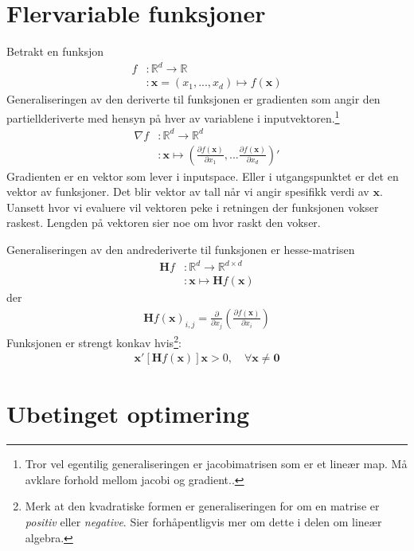 \section{Flervariable funksjoner}
Betrakt en funksjon
\begin{align}
f&: \mathbb{R}^d \to \mathbb{R} \\
&: \mathbf{x}=(x_1,...,x_d) \mapsto f(\mathbf{x})
\end{align}
Generaliseringen av den deriverte til funksjonen er gradienten som angir den partiellderiverte med hensyn på hver av variablene i inputvektoren.\footnote{Tror vel egentilig generaliseringen er jacobimatrisen som er et lineær map. Må avklare forhold mellom jacobi og gradient..}
\begin{align}
\nabla f&:\mathbb{R}^d \to \mathbb{R}^d \\
&:\mathbf{x}\mapsto \left(\frac{\partial f(\mathbf{x})}{\partial x_1},...\frac{\partial f(\mathbf{x})}{\partial x_d}\right)'
\end{align}
Gradienten er en vektor som lever i inputspace. Eller i utgangspunktet er det en vektor av funksjoner. Det blir vektor av tall når vi angir spesifikk verdi av $\mathbf{x}$. Uansett hvor vi evaluere vil vektoren peke i retningen der funksjonen vokser raskest. Lengden på vektoren sier noe om hvor raskt den vokser. 
 
Generaliseringen av den andrederiverte til funksjonen er hesse-matrisen
\begin{align}
\mathbf{H}f &: \mathbb{R}^d \to \mathbb{R}^{d\times d} \\
&:\mathbf{x} \mapsto \mathbf{H}f(\mathbf{x})
\end{align}
der
\begin{align}
\mathbf{H}f(\mathbf{x})_{i,j} = \frac{\partial}{\partial x_j}\left(\frac{\partial f(\mathbf{x})}{\partial x_i}\right)
\end{align}
Funksjonen er strengt konkav hvis\footnote{Merk at den kvadratiske formen er generaliseringen for om en matrise er \textit{positiv} eller \textit{negative}. Sier forhåpentligvis mer om dette i delen om lineær algebra.}:
\begin{align}
\mathbf{x}'\left[\mathbf{H}f(\mathbf{x})\right] \mathbf{x} > 0, \quad \forall \mathbf{x} \neq \mathbf{0}
\end{align}
\section{Ubetinget optimering}
